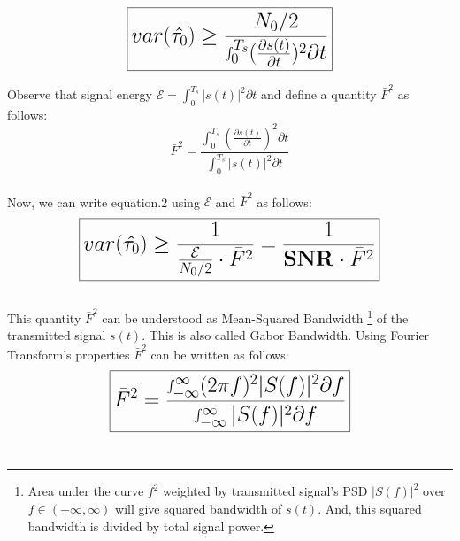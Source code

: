 \documentclass{article}
\begin{document}
\begin{equation} \label{eq3} \LARGE
\boxed{var(\hat{\tau_0}) \ge \frac{N_0/2}{\int^{T_s}_{0}(\frac{\partial s(t)}{\partial t})^2 \partial t}}
\end{equation}

Observe that signal energy $\mathcal E = \int^{T_s}_{0}|s(t)|^2\partial t$ and define a quantity $\bar{F}^2$ as follows:
$$\bar{F}^2 = \frac{\int^{T_s}_{0}(\frac{\partial s(t)}{\partial t})^2 \partial t}{\int^{T_s}_{0}|s(t)|^2\partial t}$$
\\
Now, we can write equation.2 using $\mathcal E$ and $\bar{F}^2$ as follows:
\begin{equation} \label{eq4} \LARGE
\boxed{var(\hat{\tau_0}) \ge \frac{1}{\frac{\mathcal{E}}{N_0/2}\cdot \bar{F}^2} = \frac{1}{\mathbf{SNR} \cdot \bar{F}^2}}
\end{equation}
\\
This quantity $\bar{F}^2$ can be understood as Mean-Squared Bandwidth \footnote{Area under the curve $f^2$ weighted by transmitted signal's PSD $|S(f)|^2$ over $f \in (-\infty, \infty)$ will give squared bandwidth of $s(t)$. And, this squared bandwidth is divided by total signal power.} of the transmitted signal $s(t)$. This is also called Gabor Bandwidth. Using Fourier Transform's properties $\bar{F}^2$ can be written as follows:
\begin{equation} \label{eq5}
\LARGE
\boxed{\bar{F}^2 = \frac{\int^{\infty}_{-\infty}(2\pi f)^2|S(f)|^2\partial f}{\int^{\infty}_{-\infty}|S(f)|^2\partial f}}
\end{equation}
\\
\end{document}
